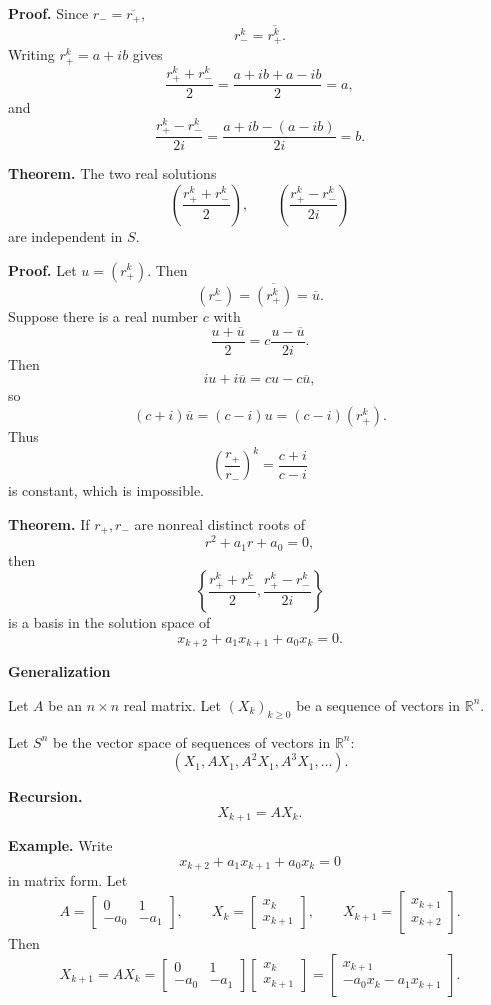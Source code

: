 \documentclass[letterpaper]{article}
\begin{document}
\textbf{Proof.} Since $r_-=\overline{r_+}$,
\[
r_-^k=\overline{r_+^k}.
\]
Writing $r_+^k=a+ib$ gives
\[
\frac{r_+^k+r_-^k}{2}
=\frac{a+ib+a-ib}{2}=a,
\]
and
\[
\frac{r_+^k-r_-^k}{2i}
=\frac{a+ib-(a-ib)}{2i}=b.
\]

\bigskip

\textbf{Theorem.} The two real solutions
\[
\left(\frac{r_+^k+r_-^k}{2}\right),
\qquad
\left(\frac{r_+^k-r_-^k}{2i}\right)
\]
are independent in $S$.

\textbf{Proof.} Let $u=(r_+^k)$. Then
\[
(r_-^k)=\overline{(r_+^k)}=\overline{u}.
\]
Suppose there is a real number $c$ with
\[
\frac{u+\overline{u}}{2}=c\frac{u-\overline{u}}{2i}.
\]
Then
\[
iu+i\overline{u}=cu-c\overline{u},
\]
so
\[
(c+i)\overline{u}=(c-i)u=(c-i)(r_+^k).
\]
Thus
\[
\left(\frac{r_+}{r_-}\right)^k=\frac{c+i}{c-i}
\]
is constant, which is impossible.

\newpage

\textbf{Theorem.} If $r_+,r_-$ are nonreal distinct roots of
\[
r^2+a_1r+a_0=0,
\]
then
\[
\left\{
\frac{r_+^k+r_-^k}{2},
\frac{r_+^k-r_-^k}{2i}
\right\}
\]
is a basis in the solution space of
\[
x_{k+2}+a_1x_{k+1}+a_0x_k=0.
\]

\bigskip

\textbf{Generalization}

Let $A$ be an $n\times n$ real matrix. Let $(X_k)_{k\geq0}$ be a sequence of vectors in $\mathbb{R}^n$.

Let $S^n$ be the vector space of sequences of vectors in $\mathbb{R}^n$:
\[
(X_1,AX_1,A^2X_1,A^3X_1,\ldots).
\]

\textbf{Recursion.}
\[
X_{k+1}=AX_k.
\]

\textbf{Example.} Write
\[
x_{k+2}+a_1x_{k+1}+a_0x_k=0
\]
in matrix form. Let
\[
A=\begin{bmatrix}0&1\\-a_0&-a_1\end{bmatrix},
\qquad
X_k=\begin{bmatrix}x_k\\x_{k+1}\end{bmatrix},
\qquad
X_{k+1}=\begin{bmatrix}x_{k+1}\\x_{k+2}\end{bmatrix}.
\]
Then
\[
X_{k+1}=AX_k
=\begin{bmatrix}0&1\\-a_0&-a_1\end{bmatrix}
\begin{bmatrix}x_k\\x_{k+1}\end{bmatrix}
=\begin{bmatrix}x_{k+1}\\-a_0x_k-a_1x_{k+1}\end{bmatrix}.
\]
\end{document}
